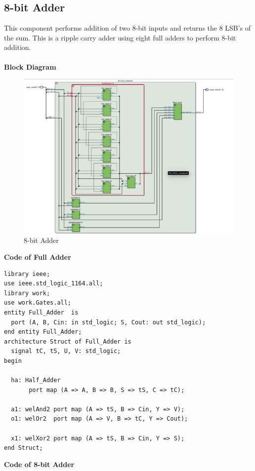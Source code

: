 \documentclass[12pt]{article}
\begin{document}
    \subsection{8-bit Adder}
        This component performs addition of two 8-bit inputs and returns the 8 LSB's of the sum.
        This is a ripple carry adder using eight full adders to perform 8-bit addition.\\\\
        \noindent
        \textbf{Block Diagram}
        \begin{figure}[H]
            \centering
            \includegraphics[width=0.6\linewidth]{eightbitadder.png}
            \caption{8-bit Adder}
            \label{fig:instru}
        \end{figure}
        \noindent
        \textbf{Code of Full Adder}
        \noindent
        \begin{verbatim}
library ieee;
use ieee.std_logic_1164.all;
library work;
use work.Gates.all;
entity Full_Adder  is
  port (A, B, Cin: in std_logic; S, Cout: out std_logic);
end entity Full_Adder;
architecture Struct of Full_Adder is
  signal tC, tS, U, V: std_logic;
begin

  ha: Half_Adder 
       port map (A => A, B => B, S => tS, C => tC);

  a1: welAnd2 port map (A => tS, B => Cin, Y => V);
  o1: welOr2  port map (A => V, B => tC, Y => Cout);
  
  x1: welXor2 port map (A => tS, B => Cin, Y => S);
end Struct;

        \end{verbatim}
        \noindent
        \textbf{Code of 8-bit Adder}
        \noindent
\end{document}
